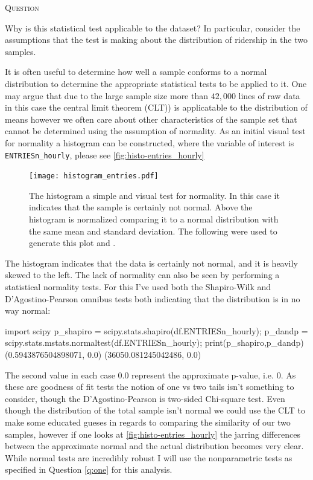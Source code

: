 \documentclass{article}
\newcounter{questionCtr}
\newenvironment{question}{%
   \bigskip\noindent%
   \refstepcounter{questionCtr}%
   \textsc{Question \thequestionCtr}%
   \newline%
   }{\par\bigskip}  %
\numberwithin{questionCtr}{section}
\numberwithin{problemCtr}{section}
\begin{document}
\begin{question}
  Why is this statistical test applicable to the dataset? In particular,
  consider the assumptions that the test is making about the distribution of
  ridership in the two samples.
  \label{q:test-applicability}
\end{question}
It is often useful to determine how well a sample conforms to a normal
distribution to determine the appropriate statistical tests to be applied to it.
One may argue that due to the large sample size more than $42,000$ lines of raw
data in this case the central limit theorem (CLT)) is applicatable to the
distribution of means however we often care about other characteristics of the
sample set that cannot be determined using the assumption of normality.  As an
initial visual test for normality a histogram can be constructed, where the
variable of interest is
\verb|ENTRIESn_hourly|, please see \autoref{fig:histo-entries_hourly}

\begin{figure}[ht]
  \centering
  \texttt{[image: histogram\_entries.pdf]}
  \caption{The histogram a simple and visual test for normality.  In this case
    it indicates that the sample is certainly not normal. Above the histogram is
    normalized comparing it to a normal distribution with the same mean and
    standard deviation.  The following were used to generate this plot
    \cite{PANDAS-visualization} and \cite{Stackoverflow-histogram-with-normal}.}
  \label{fig:histo-entries_hourly-prob-set}
\end{figure}
The histogram indicates that the data is certainly not normal, and it is heavily
skewed to the left.  The lack of normality can also be seen by performing a
statistical normality tests.  For this I've used both the Shapiro-Wilk
\cite{Scipy-shapiro-normaltest} and
D'Agostino-Pearson omnibus \cite{Scipy-mstats-normaltest} tests both indicating
that the distribution is in no way normal:

\begin{python1}
import scipy
p_shapiro = scipy.stats.shapiro(df.ENTRIESn_hourly);
p_dandp = scipy.stats.mstats.normaltest(df.ENTRIESn_hourly);
print(p_shapiro,p_dandp)
(0.5943876504898071, 0.0) (36050.081245042486, 0.0) 
\end{python1}

The second value in each case $0.0$ represent the approximate p-value, i.e. 0.
As these are goodness of fit tests the notion of one vs two tails isn't
something to consider, though the D'Agostino-Pearson is two-sided Chi-square
test.  Even though the distribution of the total sample isn't normal we could
use the CLT to make some educated gueses in regards to comparing the similarity
of our two samples, however if one looks at \autoref{fig:histo-entries_hourly}
the jarring differences between the approximate normal and the actual
distribution becomes very clear.  While normal tests are incredibly robust I
will use the nonparametric tests as specified in Question \autoref{q:one} for
this analysis. 
\end{document}
